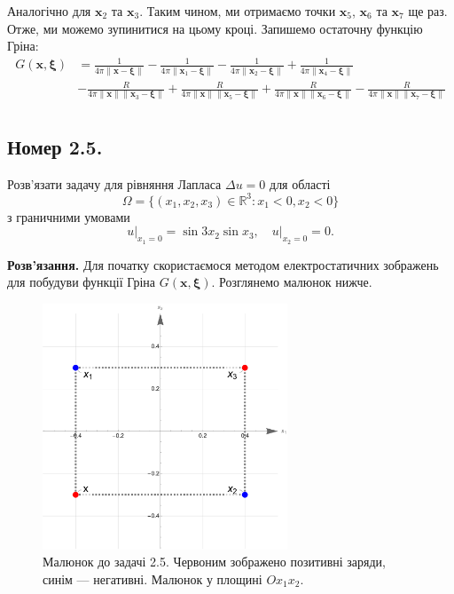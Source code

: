 \documentclass{hw_template}
\begin{document}
Аналогічно для $\mathbf{x}_2$ та $\mathbf{x}_3$. Таким чином, ми отримаємо точки $\mathbf{x}_5$, $\mathbf{x}_6$ та $\mathbf{x}_7$ ще раз. Отже, ми можемо зупинитися на цьому кроці. Запишемо остаточну функцію Гріна:
\begin{align*}
    G(\mathbf{x}, \boldsymbol{\xi}) &= \frac{1}{4\pi\|\mathbf{x} - \boldsymbol{\xi}\|} - \frac{1}{4\pi\|\mathbf{x}_1 - \boldsymbol{\xi}\|} - \frac{1}{4\pi\|\mathbf{x}_2 - \boldsymbol{\xi}\|} + \frac{1}{4\pi\|\mathbf{x}_4 - \boldsymbol{\xi}\|} \\&- \frac{R}{4\pi\|\mathbf{x}\|\|\mathbf{x}_3 - \boldsymbol{\xi}\|} + \frac{R}{4\pi\|\mathbf{x}\|\|\mathbf{x}_5 - \boldsymbol{\xi}\|} + \frac{R}{4\pi\|\mathbf{x}\|\|\mathbf{x}_6 - \boldsymbol{\xi}\|} - \frac{R}{4\pi\|\mathbf{x}\|\|\mathbf{x}_7 - \boldsymbol{\xi}\|} \\
\end{align*}

\subsection{Номер 2.5.}

\begin{problem}
    Розв'язати задачу для рівняння Лапласа $\Delta u = 0$ для області 
    \begin{equation*}
        \Omega = \{(x_1,x_2,x_3) \in \mathbb{R}^3: x_1 < 0, x_2 < 0\}    
    \end{equation*}
    з граничними умовами 
    \begin{equation*}
        u\Big|_{x_1=0}=\sin 3x_2 \sin x_3, \quad u\Big|_{x_2=0} = 0.
    \end{equation*}
\end{problem}

\textbf{Розв'язання.} Для початку скористаємося методом електростатичних зображень для побудуви функції Гріна $G(\mathbf{x}, \boldsymbol{\xi})$. Розглянемо малюнок нижче.

\begin{figure}[H]
    \centering
    \includegraphics[width=0.65\textwidth]{images/hw_2_problem_2.pdf}
    \caption{Малюнок до задачі 2.5. Червоним зображено позитивні заряди, синім --- негативні. Малюнок у площині $Ox_1x_2$.}
    \label{fig:hw_2_problem_2}
\end{figure}
\end{document}
